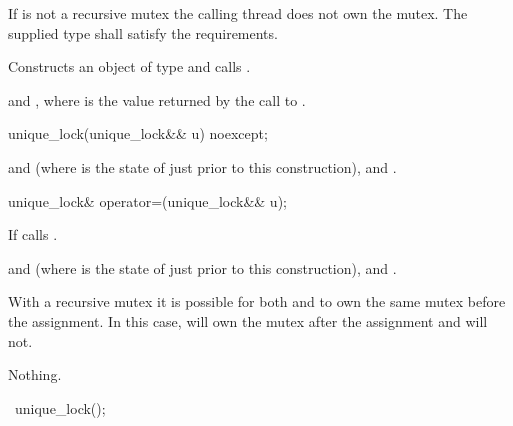 \begin{itemdescr}
\pnum
\requires If  is not a recursive mutex the calling thread does not own the mutex.
The supplied  type shall satisfy the  requirements.

\pnum
\effects Constructs an object of type  and calls .

\pnum
\postconditions {} and ,
where  is the value returned by the call to .
\end{itemdescr}

%
\begin{itemdecl}
unique_lock(unique_lock&& u) noexcept;
\end{itemdecl}

\begin{itemdescr}
\pnum\postconditions {} and  (where  is the state of  just prior to this construction),   and .
\end{itemdescr}

%
\begin{itemdecl}
unique_lock& operator=(unique_lock&& u);
\end{itemdecl}

\begin{itemdescr}
\pnum\effects If  calls .

\pnum\postconditions {} and  (where  is the state of  just prior to this construction),   and .

\pnum
\begin{note} With a recursive mutex it is possible for both  and  to own the same mutex before the assignment. In this case,  will own the mutex after the assignment and  will not. \end{note}

\pnum\throws Nothing.
\end{itemdescr}


%
\begin{itemdecl}
~unique_lock();
\end{itemdecl}

